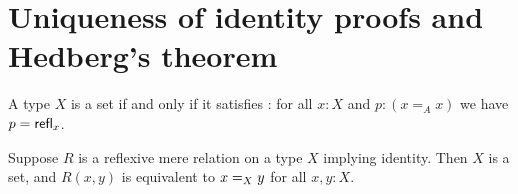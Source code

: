 \documentclass[hott-all.tex]{subfiles}
\begin{document}
\section{Uniqueness of identity proofs and Hedberg's theorem}
% 
% 
% 
\begin{thm}
 A type $X$ is a set if and only if it satisfies :
 for all $x : X$ and $p : (x =_A x)$ we have $p = \refl{x}$.
\end{thm}
% 
% 
% 
% 
\begin{thm}
  Suppose $R$ is a reflexive mere relation on a type $X$ implying identity.
  Then $X$ is a set, and $R(x,y)$ is equivalent to $\id[X]{x}{y}$ for all $x,y:X$.
\end{thm}
% 
\end{document}
